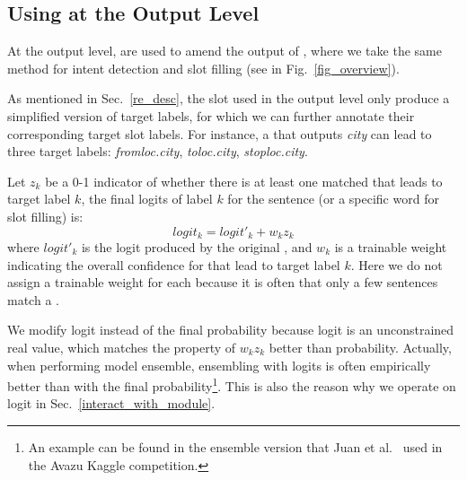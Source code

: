 \subsection{Using \REs at the Output Level}
\label{fusion_with_output} At the output level, \REs are used to amend the output of \NNs, where we take the same method for intent
detection and slot filling (see  in Fig.~\ref{fig_overview}).


As mentioned in Sec.~\ref{re_desc}, the slot \REs used in the output level only produce a simplified version of target labels, for which
we can further
annotate their corresponding target slot labels.
For instance, a \RE that outputs \emph{city} can lead to three target labels: \emph{fromloc.city}, \emph{toloc.city},
\emph{stoploc.city}.

Let $z_k$ be a 0-1 indicator of whether there is at least one matched \RE that leads to target label $k$, the final logits
of label $k$ for the sentence (or a specific word for slot filling) is:
\begin{equation}
logit_k = logit'_k + w_k z_k
\end{equation}
where $logit'_k$ is the logit produced by the original \NN, and $w_k$ is a trainable weight indicating the overall confidence for \REs that
lead to target label $k$. Here we do not assign a trainable weight for each \RE because it is often that only a few sentences match a \RE.

We modify logit instead of the final probability because logit is an unconstrained real value, which matches the property of $w_k z_k$ better than probability.
Actually, when performing model ensemble,
ensembling with logits is often empirically better than with the final probability\footnote{
An example can be found in the ensemble version that Juan et al.~ used in the Avazu Kaggle competition.
}.
This is also the reason why we operate on logit %
in Sec.~\ref{interact_with_module}.
